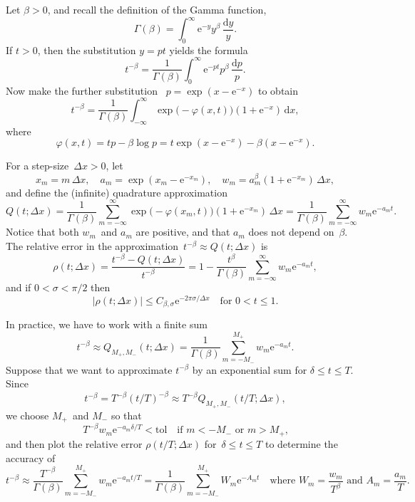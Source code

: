 \documentclass[a4paper,12pt]{article}
\newcommand{\ud}{\mathrm{d}}
\newcommand{\ue}{\mathrm{e}}
\begin{document}
Let $\beta>0$, and recall the definition of the Gamma function,
\[
\Gamma(\beta)=\int_0^\infty\ue^{-y}y^\beta\,\frac{\ud y}{y}.
\]
If $t>0$, then the substitution $y=pt$ yields the formula
\[
t^{-\beta}=\frac{1}{\Gamma(\beta)}\int_0^\infty
    \ue^{-pt}p^\beta\,\frac{\ud p}{p}.
\]
Now make the further substitution~\cite{McLean2018} $p=\exp(x-\ue^{-x})$ to
obtain
\[
t^{-\beta}=\frac{1}{\Gamma(\beta)}\int_{-\infty}^\infty
    \exp\bigl(-\varphi(x, t)\bigr)(1+\ue^{-x})\,\ud x,
\]
where
\[
\varphi(x,t)=tp-\beta\log p=t\exp(x-\ue^{-x})-\beta(x-\ue^{-x}).
\]

For a step-size~$\Delta x>0$, let
\[
x_m=m\,\Delta x,\quad
a_m=\exp(x_m-\ue^{-x_m}),\quad
w_m=a_m^\beta(1+\ue^{-x_m})\,\Delta x,
\]
and define the (infinite) quadrature approximation
\[
Q(t;\Delta x)=\frac{1}{\Gamma(\beta)}\sum_{m=-\infty}^\infty
    \exp\bigl(-\varphi(x_m, t)\bigr)(1+\ue^{-x_m})\,\Delta x
=\frac{1}{\Gamma(\beta)}\sum_{m=-\infty}^\infty w_m\ue^{-a_mt}.
\]
Notice that both $w_m$~and $a_m$ are positive, and that $a_m$ does not depend
on~$\beta$. The relative error in the
approximation~$t^{-\beta}\approx Q(t;\Delta x)$ is
\[
\rho(t;\Delta x)=\frac{t^{-\beta}-Q(t;\Delta x)}{t^{-\beta}}
=1-\frac{t^\beta}{\Gamma(\beta)}\sum_{m=-\infty}^\infty w_m\ue^{-a_mt},
\]
and if $0<\sigma<\pi/2$ then~\cite[Theorem~4]{McLean2018}
\begin{equation}\label{eq: relative error}
|\rho(t;\Delta x)|\le C_{\beta,\sigma}\ue^{-2\pi\sigma/\Delta x}
    \quad\text{for $0<t\le 1$.}
\end{equation}

In practice, we have to work with a finite sum
\[
t^{-\beta}\approx Q_{M_+,M_-}(t;\Delta x)
    =\frac{1}{\Gamma(\beta)}\sum_{m=-M_-}^{M_+}w_m\ue^{-a_mt}.
\]
Suppose that we want to approximate $t^{-\beta}$ by an exponential sum for
$\delta\le t\le T$.  Since
\[
t^{-\beta}=T^{-\beta}(t/T)^{-\beta}\approx T^{-\beta}Q_{M_+,M_-}(t/T; \Delta x),
\]
we choose $M_+$~and $M_-$ so that
\[
T^{-\beta}w_m\ue^{-a_m\delta/T}<\mathrm{tol}\quad\text{if $m<-M_-$ or $m>M_+$,}
\]
and then plot the relative error $\rho(t/T; \Delta x)$ for~$\delta\le t\le T$
to determine the accuracy of
\[
t^{-\beta}\approx \frac{T^{-\beta}}{\Gamma(\beta)}\sum_{m=-M_-}^{M_+}
    w_m\ue^{-a_mt/T}=\frac{1}{\Gamma(\beta)}\sum_{m=-M_-}^{M_+}W_m\ue^{-A_mt}
\quad\text{where $W_m=\frac{w_m}{T^\beta}$ and $A_m=\frac{a_m}{T}$.}
\]
\end{document}
